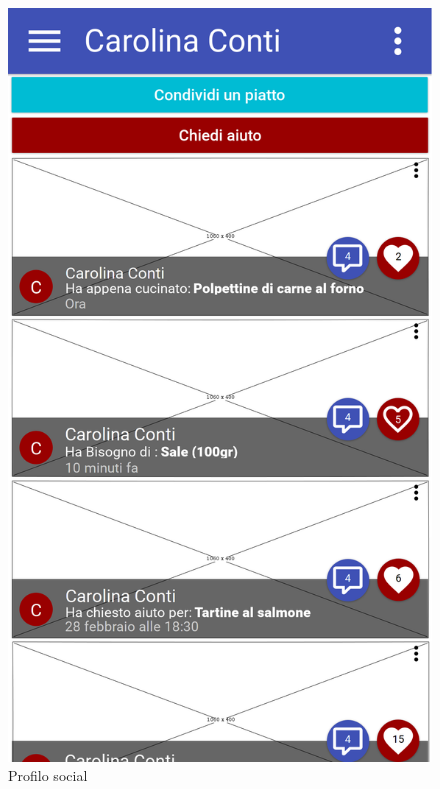 \begin{figure}[H]
\begin{minipage}{.49\textwidth}
		\includegraphics[width=\textwidth]{img/wireframe/profilo_social.png}
		\caption{Profilo social}
		\label{fig:profilo_social}
	\end{minipage}
\end{figure}	
